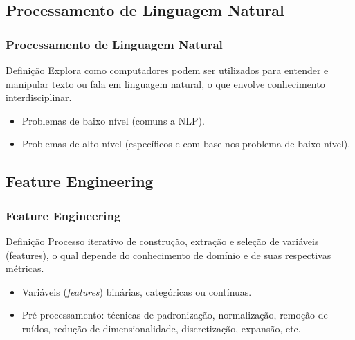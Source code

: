 \documentclass{beamer}
\begin{document}
\subsection{Processamento de Linguagem Natural}
\begin{frame}
\frametitle{Processamento de Linguagem Natural}
\begin{block}{Definição}
Explora como computadores podem ser utilizados para entender e manipular texto ou fala em linguagem natural, o que envolve conhecimento interdisciplinar.
\end{block}
\begin{multicols}{2}
\begin{itemize}
\item Problemas de baixo nível (comuns a NLP).
\end{itemize}

\columnbreak

\begin{itemize}
\item Problemas de alto nível (específicos e com base nos problema de baixo nível).
\end{itemize}
\end{multicols}
\end{frame}
\subsection{Feature Engineering}
\begin{frame}
\frametitle{Feature Engineering}
\begin{block}{Definição}
Processo iterativo de construção, extração e seleção de variáveis (features), o qual depende do conhecimento de domínio e de suas respectivas métricas.
\end{block}
\begin{itemize}
\item Variáveis (\textit{features}) binárias, categóricas ou contínuas.
\item Pré-processamento: técnicas de padronização, normalização, remoção de ruídos, redução de dimensionalidade, discretização, expansão, etc.
\end{itemize}
\end{frame}
\end{document}

